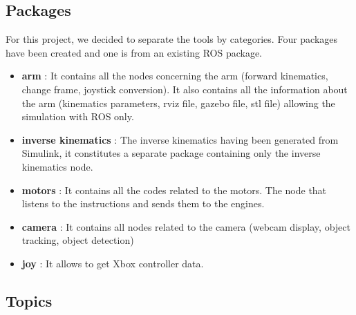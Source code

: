 \subsection{Packages}
\hspace{\parindent} For this project, we decided to separate the tools by categories. Four packages have been created and one is from an existing ROS package.
\begin{itemize}
    \item \textbf{arm} : It contains all the nodes concerning the arm (forward kinematics, change frame, joystick conversion). It also contains all the information about the arm (kinematics parameters, rviz file, gazebo file, stl file) allowing the simulation with ROS only.
    \item \textbf{inverse kinematics} : The inverse kinematics having been generated from Simulink, it constitutes a separate package containing only the inverse kinematics node.
    \item  \textbf{motors} : It contains all the codes related to the motors. The node that listens to the instructions and sends them to the engines.
    \item  \textbf{camera} : It contains all nodes related to the camera (webcam display, object tracking, object detection)
    \item  \textbf{joy} : It allows to get Xbox controller data.
\end{itemize}

\subsection{Topics}

